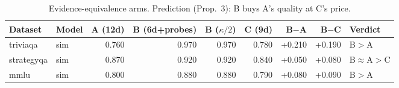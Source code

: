 \begin{table}[t]
\centering
\small
\begin{tabular}{llrrrrrrl}
\toprule
Dataset & Model & A (12d) & B (6d+probes) & B ($\kappa/2$) & C (9d) & B$-$A & B$-$C & Verdict \\
\midrule
triviaqa & sim & 0.760 & 0.970 & 0.970 & 0.780 & +0.210 & +0.190 & B$>$A \\
strategyqa & sim & 0.870 & 0.920 & 0.920 & 0.840 & +0.050 & +0.080 & B$\approx$A$>$C \\
mmlu & sim & 0.800 & 0.880 & 0.880 & 0.790 & +0.080 & +0.090 & B$>$A \\
\bottomrule
\end{tabular}
\caption{Evidence-equivalence arms. Prediction (Prop.~3): B buys A's quality at C's price.}
\label{tab:arms}
\end{table}
